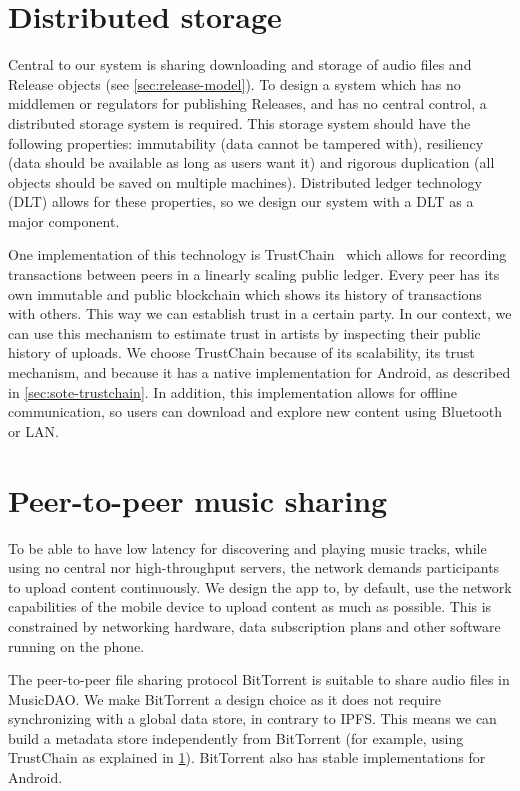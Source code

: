 \section{Distributed storage}
\label{sec:distributed-storage}
Central to our system is sharing downloading and storage of audio files and Release objects (see \ref{sec:release-model}). To design a system which has no middlemen or regulators for publishing Releases, and has no central control, a distributed storage system is required. This storage system should have the following properties: immutability (data cannot be tampered with), resiliency (data should be available as long as users want it) and rigorous duplication (all objects should be saved on multiple machines). Distributed ledger technology (DLT) allows for these properties, so we design our system with a DLT as a major component.

One implementation of this technology is TrustChain~\citep{otte2017trustchain} which allows for recording transactions between peers in a linearly scaling public ledger. Every peer has its own immutable and public blockchain which shows its history of transactions with others. This way we can establish trust in a certain party. In our context, we can use this mechanism to estimate trust in artists by inspecting their public history of uploads. We choose TrustChain because of its scalability, its trust mechanism, and because it has a native implementation for Android, as described in \ref{sec:sote-trustchain}. In addition, this implementation allows for offline communication, so users can download and explore new content using Bluetooth or LAN.

\section{Peer-to-peer music sharing}
To be able to have low latency for discovering and playing music tracks, while using no central nor high-throughput servers, the network demands participants to upload content continuously. We design the app to, by default, use the network capabilities of the mobile device to upload content as much as possible. This is constrained by networking hardware, data subscription plans and other software running on the phone.

The peer-to-peer file sharing protocol BitTorrent is suitable to share audio files in MusicDAO. We make BitTorrent a design choice as it does not require synchronizing with a global data store, in contrary to IPFS. This means we can build a metadata store independently from BitTorrent (for example, using TrustChain as explained in \ref{sec:distributed-storage}). BitTorrent also has stable implementations for Android.

